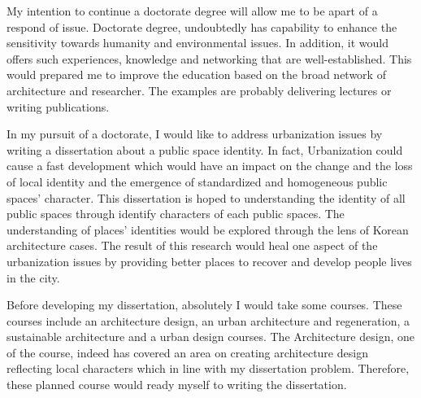\documentclass[../main.tex]{subfiles}
\begin{document}
My intention to continue a doctorate degree will allow me to be apart of a respond of issue.
Doctorate degree, undoubtedly has capability to enhance the sensitivity towards humanity and environmental issues.
In addition, it would offers such experiences, knowledge and networking that are well-established.
This would prepared me to improve the education based on the broad network of architecture and researcher. The examples are probably delivering lectures or writing publications.


In my pursuit of a doctorate, I would like to address urbanization issues by writing a dissertation about  a public space identity. In fact, Urbanization  could cause a fast development which would have an impact on the change and the loss of local identity and the emergence of standardized and homogeneous public spaces' character.  This dissertation is hoped to understanding the identity of all public spaces through identify characters of each public spaces. The understanding of places' identities would be explored through the lens of Korean architecture cases. The result of this research would heal one aspect of the urbanization issues by providing better places to recover and develop people lives in the city.

Before developing my dissertation, absolutely I would take some courses. These courses include an architecture design, an urban architecture and regeneration, a sustainable architecture and a urban design courses.
The Architecture design, one of the course, indeed has covered an area on creating architecture design reflecting local characters which in line with my dissertation problem. Therefore, these planned course would ready myself to writing the dissertation.
\end{document}
